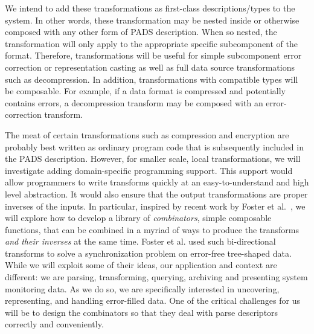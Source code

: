 We intend to add these transformations as first-class
descriptions/types to the system.  In other words, these
transformation may be nested inside or otherwise composed with any
other form of PADS description.  When so nested, the transformation
will only apply to the appropriate specific subcomponent of the
format.  Therefore, transformations will be useful for simple
subcomponent error correction or representation casting as well as
full data source transformations such as decompression.  In addition,
transformations with compatible types will be composable.  For
example, if a data format is compressed and potentially contains
errors, a decompression transform may be composed with an
error-correction transform.

The meat of certain transformations such as compression and encryption
are probably best written as ordinary program code that is
subsequently included in the PADS description.  However, for smaller
scale, local transformations, we will investigate adding domain-specific
programming support.  This support would allow programmers to write
transforms quickly at an easy-to-understand and high level
abstraction.  It would also ensure that the output transformations are
proper inverses of the inputs.  In particular, inspired by recent work
by Foster et al.~\cite{foster+:lens}, we will explore how to develop a
library of {\em combinators}, simple composable functions, that can be
combined in a myriad of ways to produce the transforms {\em and their
inverses} at the same time.  Foster et al. used such bi-directional transforms to
solve a synchronization problem on error-free tree-shaped data. 
While we will exploit some of their
ideas, our application and
context are different: we are parsing, transforming, querying, archiving
and presenting system monitoring data.
As we do so, we are specifically interested in uncovering,
representing, and handling error-filled data.  One of the critical
challenges for us will be to design the combinators so that they deal
with \pads{} parse descriptors correctly
and conveniently.

